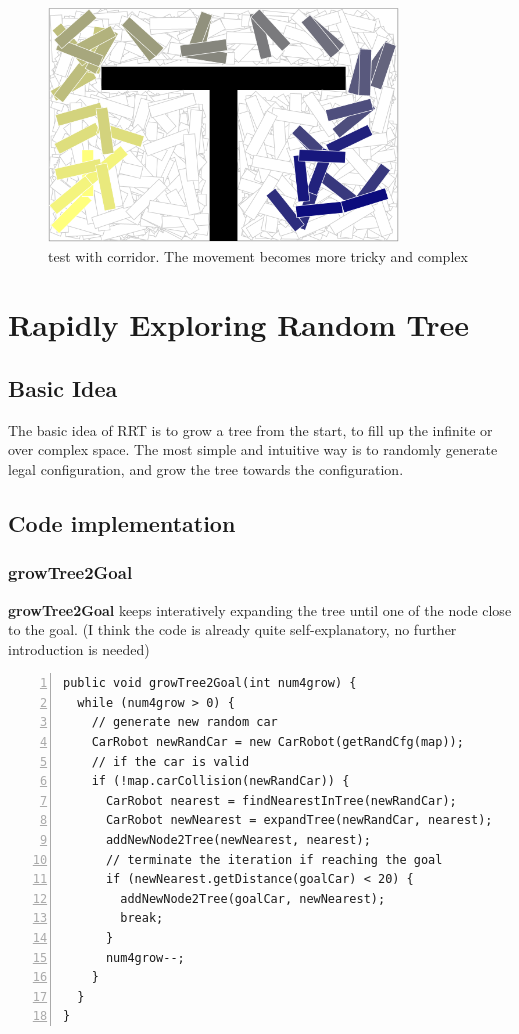 \documentclass{article}
\begin{document}
\begin{figure}[!h]
\centering
\includegraphics[width=0.827\textwidth]{1-2.png}
\caption{test with corridor. The movement becomes more tricky and complex}
\label{1-2}
\end{figure}






\clearpage
\section{Rapidly Exploring Random Tree}
\subsection{Basic Idea}
The basic idea of RRT is to grow a tree from the start, to fill up the infinite or over complex space. The most simple and intuitive way is to randomly generate legal configuration, and grow the tree towards the configuration. 





\subsection{Code implementation}


\subsubsection{growTree2Goal}

\textbf{growTree2Goal} keeps interatively expanding the tree until one of the node close to the goal. (I think the code is already quite self-explanatory, no further introduction is needed) 

\begin{lstlisting}[numbers=left]
public void growTree2Goal(int num4grow) {
  while (num4grow > 0) {
    // generate new random car
    CarRobot newRandCar = new CarRobot(getRandCfg(map));
    // if the car is valid
    if (!map.carCollision(newRandCar)) {
      CarRobot nearest = findNearestInTree(newRandCar);
      CarRobot newNearest = expandTree(newRandCar, nearest);
      addNewNode2Tree(newNearest, nearest);
      // terminate the iteration if reaching the goal
      if (newNearest.getDistance(goalCar) < 20) {
        addNewNode2Tree(goalCar, newNearest);
        break;
      }
      num4grow--;
    }
  }
}
\end{lstlisting}
\end{document}
